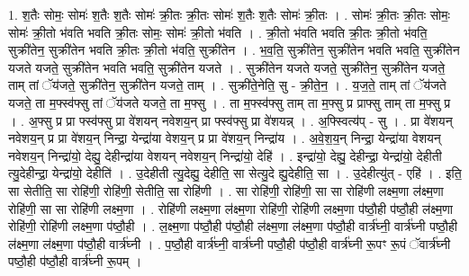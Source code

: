 \documentclass[17pt]{extarticle}
\begin{document}
1. श॒तैः सोमः॒ सोमः॑ श॒तैः श॒तैः सोमः॑ क्री॒तः क्री॒तः सोमः॑ श॒तैः श॒तैः सोमः॑ क्री॒तः । . सोमः॑ क्री॒तः क्री॒तः सोमः॒ सोमः॑ क्री॒तो भ॑वति भवति क्री॒तः सोमः॒ सोमः॑ क्री॒तो भ॑वति । . क्री॒तो भ॑वति भवति क्री॒तः क्री॒तो भ॑वति॒ सुक्री॑तेन॒ सुक्री॑तेन भवति क्री॒तः क्री॒तो भ॑वति॒ सुक्री॑तेन । . भ॒व॒ति॒ सुक्री॑तेन॒ सुक्री॑तेन भवति भवति॒ सुक्री॑तेन यजते यजते॒ सुक्री॑तेन भवति भवति॒ सुक्री॑तेन यजते । . सुक्री॑तेन यजते यजते॒ सुक्री॑तेन॒ सुक्री॑तेन यजते॒ ताम् तां ॅय॑जते॒ सुक्री॑तेन॒ सुक्री॑तेन यजते॒ ताम् । . सुक्री॑ते॒नेति॒ सु - क्री॒ते॒न॒ । . य॒ज॒ते॒ ताम् तां ॅय॑जते यजते॒ ता म॒फ्स्व॑फ्सु तां ॅय॑जते यजते॒ ता म॒फ्सु । . ता म॒फ्स्व॑फ्सु ताम् ता म॒फ्सु प्र प्राफ्सु ताम् ता म॒फ्सु प्र । . अ॒फ्सु प्र प्रा फ्स्व॑फ्सु प्रा वे॑शयन् नवेशय॒न् प्रा फ्स्व॑फ्सु प्रा वे॑शयन्न् । . अ॒फ्स्वित्य॑प् - सु । . प्रा वे॑शयन् नवेशय॒न् प्र प्रा वे॑शय॒न् निन्द्रा॒ येन्द्रा॑या वेशय॒न् प्र प्रा वे॑शय॒न् निन्द्रा॑य । . अ॒वे॒श॒य॒न् निन्द्रा॒ येन्द्रा॑या वेशयन् नवेशय॒न् निन्द्रा॑यो॒ देह्यु॒ देहीन्द्रा॑या वेशयन् नवेशय॒न् निन्द्रा॑यो॒ देहि॑ । . इन्द्रा॑यो॒ देह्यु॒ देहीन्द्रा॒ येन्द्रा॑यो॒ देहीती त्यु॒देहीन्द्रा॒ येन्द्रा॑यो॒ देहीति॑ । . उ॒देहीती त्यु॒देह्यु॒ देहीति॒ सा सेत्यु॒दे ह्यु॒देहीति॒ सा । . उ॒देहीत्यु॑त् - एहि॑ । . इति॒ सा सेतीति॒ सा रोहि॑णी॒ रोहि॑णी॒ सेतीति॒ सा रोहि॑णी । . सा रोहि॑णी॒ रोहि॑णी॒ सा सा रोहि॑णी लक्ष्म॒णा ल॑क्ष्म॒णा रोहि॑णी॒ सा सा रोहि॑णी लक्ष्म॒णा । . रोहि॑णी लक्ष्म॒णा ल॑क्ष्म॒णा रोहि॑णी॒ रोहि॑णी लक्ष्म॒णा प॑ष्ठौ॒ही प॑ष्ठौ॒ही ल॑क्ष्म॒णा रोहि॑णी॒ रोहि॑णी लक्ष्म॒णा प॑ष्ठौ॒ही । . ल॒क्ष्म॒णा प॑ष्ठौ॒ही प॑ष्ठौ॒ही ल॑क्ष्म॒णा ल॑क्ष्म॒णा प॑ष्ठौ॒ही वार्त्र॑घ्नी॒ वार्त्र॑घ्नी पष्ठौ॒ही ल॑क्ष्म॒णा ल॑क्ष्म॒णा प॑ष्ठौ॒ही वार्त्र॑घ्नी । . प॒ष्ठौ॒ही वार्त्र॑घ्नी॒ वार्त्र॑घ्नी पष्ठौ॒ही प॑ष्ठौ॒ही वार्त्र॑घ्नी रू॒पꣳ रू॒पं ॅवार्त्र॑घ्नी पष्ठौ॒ही प॑ष्ठौ॒ही वार्त्र॑घ्नी रू॒पम् । \newline
\end{document}
